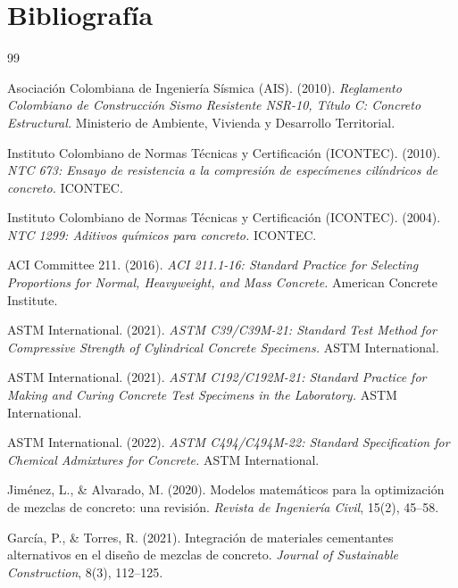 \section{Bibliografía}

\begin{thebibliography}{99}


Asociación Colombiana de Ingeniería Sísmica (AIS). (2010).
\textit{Reglamento Colombiano de Construcción Sismo Resistente NSR-10, Título C: Concreto Estructural.}
Ministerio de Ambiente, Vivienda y Desarrollo Territorial.

Instituto Colombiano de Normas Técnicas y Certificación (ICONTEC). (2010).
\textit{NTC 673: Ensayo de resistencia a la compresión de especímenes cilíndricos de concreto.}
ICONTEC.

Instituto Colombiano de Normas Técnicas y Certificación (ICONTEC). (2004).
\textit{NTC 1299: Aditivos químicos para concreto.}
ICONTEC.


ACI Committee 211. (2016).
\textit{ACI 211.1-16: Standard Practice for Selecting Proportions for Normal, Heavyweight, and Mass Concrete.}
American Concrete Institute.

ASTM International. (2021).
\textit{ASTM C39/C39M-21: Standard Test Method for Compressive Strength of Cylindrical Concrete Specimens.}
ASTM International.

ASTM International. (2021).
\textit{ASTM C192/C192M-21: Standard Practice for Making and Curing Concrete Test Specimens in the Laboratory.}
ASTM International.

ASTM International. (2022).
\textit{ASTM C494/C494M-22: Standard Specification for Chemical Admixtures for Concrete.}
ASTM International.


Jiménez, L., \& Alvarado, M. (2020).
Modelos matemáticos para la optimización de mezclas de concreto: una revisión.
\textit{Revista de Ingeniería Civil}, 15(2), 45--58.

García, P., \& Torres, R. (2021).
Integración de materiales cementantes alternativos en el diseño de mezclas de concreto.
\textit{Journal of Sustainable Construction}, 8(3), 112--125.


\end{thebibliography}

